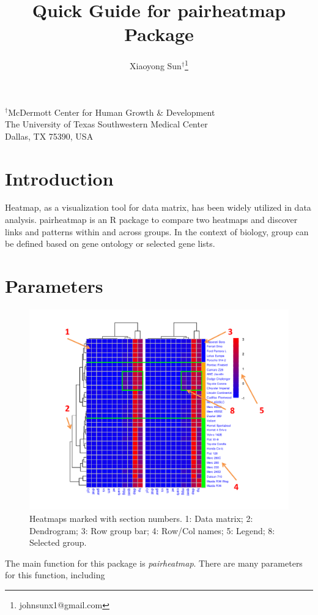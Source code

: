 \documentclass[a4paper]{article}
\author{Xiaoyong Sun$^\dagger$\footnote{johnsunx1@gmail.com}}
\begin{document}

\title{Quick Guide for pairheatmap Package}
\maketitle
\begin{center}$^\dagger$McDermott Center for Human Growth \& Development \\ The University of Texas Southwestern Medical Center \\ Dallas, TX 75390, USA
\end{center}

\tableofcontents

\section{Introduction}
Heatmap, as a visualization tool for data matrix, has been widely utilized in data analysis. pairheatmap is an R package to compare two heatmaps and discover links and patterns within and across groups. In the context of biology, group can be defined based on gene ontology or selected gene lists.
\section{Parameters}
\begin{figure}[h!tb]
\centering
\includegraphics[scale=0.6]{figure.pdf}
\caption{Heatmaps marked with section numbers. 1: Data matrix; 2: Dendrogram; 3: Row group bar; 4: Row/Col names; 5: Legend; 8: Selected group.}
\label{figure}
\end{figure}
The main function for this package is \textit{pairheatmap}. There are many parameters for this function, including
\end{document}
